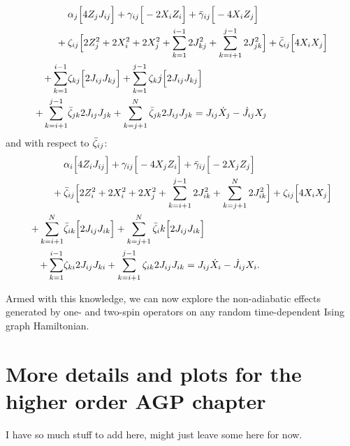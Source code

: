 \begin{equation}\label{eq:ising_graph_minimise_zeta}
    \begin{aligned}
        &\alpha_j\Big[ 4 Z_j J_{ij} \Big] + \gamma_{ij}\Big[ - 2 X_i Z_i\Big] + \Bar{\gamma}_{ij} \Big[ - 4 X_i Z_j \Big] \\
        + \: &\zeta_{ij} \Big[ 2 Z_j^2 + 2X_i^2 + 2X_j^2 + \sum_{k = 1}^{i-1} 2 J_{kj}^2 + \sum_{k = i+1}^{j-1} 2 J_{jk}^2 \Big] + \Bar{\zeta}_{ij}\Big[ 4 X_i X_j \Big] \\
        + \sum_{k = 1}^{i-1} &\zeta_{kj}\Big[ 2 J_{ij} J_{kj} \Big] + \sum_{k = 1}^{j-1} \zeta_kj \Big[2 J_{ij}J_{kj}\Big] \\
        + \sum_{k = i +1}^{j-1} &\Bar{\zeta}_{jk} 2 J_{ij} J_{jk} + \sum_{k = j +1}^N \Bar{\zeta}_{jk} 2 J_{ij} J_{jk} = J_{ij} \dot{X}_j - \dot{J}_{ij} X_j
    \end{aligned}
\end{equation}
and with respect to $\Bar{\zeta}_{ij}$:
\begin{equation}\label{eq:ising_graph_minimise_zetabar}
    \begin{aligned}
        &\alpha_i\Big[ 4 Z_i J_{ij} \Big] + \gamma_{ij}\Big[ - 4 X_j Z_i\Big] + \Bar{\gamma}_{ij} \Big[ - 2 X_j Z_j \Big] \\
        + \: &\Bar{\zeta}_{ij} \Big[ 2 Z_i^2 + 2X_i^2 + 2X_j^2 + \sum_{k = i+1}^{j-1} 2 J_{ik}^2 + \sum_{k = j+1}^N 2 J_{ik}^2 \Big] + \zeta_{ij}\Big[ 4 X_i X_j \Big] \\
        + \sum_{k = i+1}^N &\Bar{\zeta}_{ik}\Big[ 2 J_{ij} J_{ik} \Big] + \sum_{k = j+1}^N \Bar{\zeta}_ik \Big[2 J_{ij}J_{ik}\Big] \\
        + \sum_{k = 1}^{i-1} &\zeta_{ki} 2 J_{ij} J_{ki} + \sum_{k = i+1}^{j-1} \zeta_{ik} 2 J_{ij} J_{ik} = J_{ij} \dot{X}_i - \dot{J}_{ij} X_i.
    \end{aligned}
\end{equation}

Armed with this knowledge, we can now explore the non-adiabatic effects generated by one- and two-spin operators on any random time-dependent Ising graph Hamiltonian. 

\chapter{More details and plots for the higher order AGP chapter}\label{app:higher_order_AGP}

I have so much stuff to add here, might just leave some here for now. 

